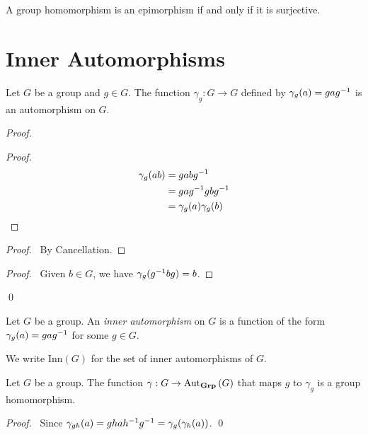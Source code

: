 \begin{prop}
A group homomorphism is an epimorphism if and only if it is surjective.
\end{prop}


\section{Inner Automorphisms}

\begin{prop}
    Let $G$ be a group and $g \in G$. The function $\gamma_g : G \rightarrow G$ defined by $\gamma_g(a) = ga{g}^{-1}$ is an automorphism on $G$.
\end{prop}

\begin{proof}
    \pf
    \begin{proof}
        \pf
        \begin{align*}
            \gamma_g(ab) & = gab{g}^{-1}              \\
                         & = ga{g}^{-1} gb{g}^{-1}     \\
                         & = \gamma_g(a) \gamma_g(b)
        \end{align*}
    \end{proof}
    \begin{proof}
        \pf\ By Cancellation.
    \end{proof}
    \begin{proof}
        \pf\ Given $b \in G$, we have $\gamma_g({g}^{-1}bg) = b$.
    \end{proof}
    \qed
\end{proof}

\begin{df}
    Let $G$ be a group. An \emph{inner automorphism} on $G$ is a function of the form $\gamma_g(a) = ga{g}^{-1}$ for some $g \in G$.
    
    We write $\mathrm{Inn}(G)$ for the set of inner automorphisms of $G$.
\end{df}

\begin{prop}
    Let $G$ be a group.
    The function $\gamma : G \rightarrow \mathrm{Aut}_{\mathbf{Grp}} \left( {G} \right)$ that maps $g$ to $\gamma_g$ is a group homomorphism.
\end{prop}

\begin{proof}
    \pf\ Since $\gamma_{gh}(a) = gha{h}^{-1}{g}^{-1} = \gamma_g(\gamma_h(a))$. \qed
\end{proof}

